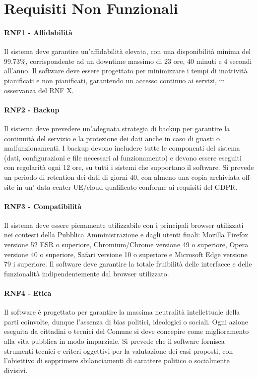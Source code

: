 \chapter{Requisiti Non Funzionali}
\subsubsection{RNF1 - Affidabilità}
Il sistema deve garantire un'affidabilità elevata, con una disponibilità minima del 99.73{\%}, corrispondente ad un downtime massimo di 23 ore, 40 minuti e 4 secondi all'anno. Il software deve essere progettato per minimizzare i tempi di inattività pianificati e non pianificati, garantendo un accesso continuo ai servizi, in osservanza del RNF X.

\subsubsection{RNF2 - Backup}
Il sistema deve prevedere un’adeguata strategia di backup per garantire la continuità del servizio e la protezione dei dati anche in caso di guasti o malfunzionamenti.
I backup devono includere tutte le componenti del sistema (dati, configurazioni e file necessari al funzionamento) e devono essere eseguiti con regolarità ogni 12 ore, su tutti i sistemi che supportano il software. Si prevede un periodo di retention dei dati di giorni 40, con almeno una copia archiviata off-site in un' data center UE/cloud qualificato conforme ai requisiti del GDPR.

\subsubsection{RNF3 - Compatibilità}
Il sistema deve essere pienamente utilizzabile con i principali browser utilizzati nei contesti della Pubblica Amministrazione e dagli utenti finali: Mozilla Firefox versione 52 ESR o superiore, Chromium/Chrome versione 49 o superiore, Opera versione 40 o superiore, Safari versione 10 o superiore e Microsoft Edge versione 79 i superiore. Il software deve garantire la totale fruibilità delle interfacce e delle funzionalità indipendentemente dal browser utilizzato.

\subsubsection{RNF4 - Etica}
Il software è progettato per garantire la massima neutralità intellettuale della parti coinvolte, dunque l'assenza di bias politici, ideologici o sociali. Ogni azione eseguita da cittadini o tecnici del Comune si deve concepire come miglioramento alla vita pubblica in modo imparziale. Si prevede che il software fornisca strumenti tecnici e criteri oggettivi per la valutazione dei casi proposti, con l'obiettivo di sopprimere sbilanciamenti di carattere politico o socialmente divisivi. 

